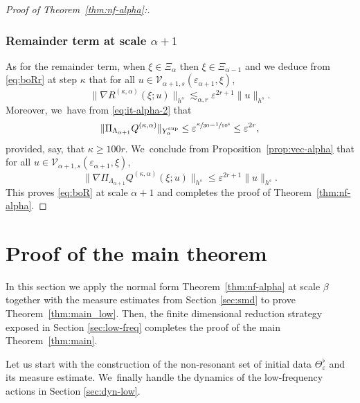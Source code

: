 \documentclass[10pt,a4paper]{amsart}
\theoremstyle{plain}
\theoremstyle{definition}
\newcommand{\1}{\mathbf{1}}
\newcommand{\Ysup}[1]{Y_{#1}^{\mathrm{sup}}}
\let\epsilon\varepsilon
\begin{document}
\begin{proof}[Proof of Theorem~\ref{thm:nf-alpha}:]
\subsubsection*{Remainder term at scale $\alpha+1$} As for the remainder term, when $\xi\in\Xi_{\alpha}$ then $\xi\in\Xi_{\alpha-1}$ and we deduce from \eqref{eq:boRr} at step $\kappa$ that for all $u\in\mathcal{V}_{\alpha+1,s}(\epsilon_{\alpha+1}, \xi)$,
\[
\|\nabla R^{(\kappa,\alpha)}(\xi;u)\|_{h^{s}}
\lesssim_{\alpha,r}
\epsilon^{2r+1}
\|u\|_{h^{s}}.
\]
Moreover, we~have from \eqref{eq:it-alpha-2} that
\[
\|\Pi_{\Lambda_{\alpha+1}}Q^{(\kappa,\alpha)}
\|_{\Ysup{\alpha}}
\leq \epsilon^{\sfrac{\kappa}{30}-\sfrac{1}{10^{4}}} \leq \epsilon^{2r},
\]
provided, say, that $\kappa\geq100r$. We~conclude from Proposition~\ref{prop:vec-alpha} that for all $u\in\mathcal{V}_{\alpha+1,s}(\epsilon_{\alpha+1},\xi)$,
\[
\|\nabla \Pi_{\Lambda_{\alpha+1}}Q^{(\kappa,\alpha)}(\xi;
u)\|_{h^{s}}
\leq \epsilon^{2r+1}\|u\|_{h^{s}}.
\]
This proves \eqref{eq:boR} at scale $\alpha+1$ and completes the proof of Theorem~\ref{thm:nf-alpha}.
\end{proof}

\section{Proof of the main theorem}
\label{sec:pr-thm}

In this section we apply the normal form Theorem~\ref{thm:nf-alpha} at scale $\beta$ together with the measure estimates from Section \ref{sec:smd} to prove Theorem~\ref{thm:main_low}. Then, the finite dimensional reduction strategy exposed in Section \ref{sec:low-freq} completes the proof of the main Theorem~\ref{thm:main}.

Let us start with the construction of the non-resonant set of initial data $\Theta_{\epsilon}^{\flat}$ and its measure estimate. We~finally handle the dynamics of the low-frequency actions in Section \ref{sec:dyn-low}.
\end{document}
